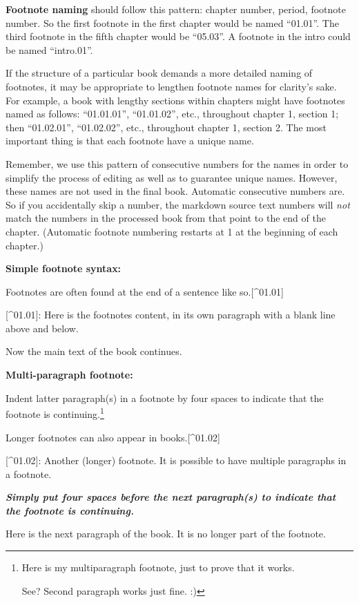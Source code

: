 \documentclass[
]{book}
\newenvironment{Shaded}{\begin{snugshade}}{\end{snugshade}}
\newcommand{\InformationTok}[1]{\textcolor[rgb]{0.56,0.35,0.01}{\textbf{\textit{#1}}}}
\newcommand{\NormalTok}[1]{#1}
\newcommand{\OtherTok}[1]{\textcolor[rgb]{0.56,0.35,0.01}{#1}}
\begin{document}
\textbf{Footnote naming} should follow this pattern: chapter number, period, footnote number. So the first footnote in the first chapter would be named ``01.01''. The third footnote in the fifth chapter would be ``05.03''. A footnote in the intro could be named ``intro.01''.

If the structure of a particular book demands a more detailed naming of footnotes, it may be appropriate to lengthen footnote names for clarity's sake. For example, a book with lengthy sections within chapters might have footnotes named as follows: ``01.01.01'', ``01.01.02'', etc., throughout chapter 1, section 1; then ``01.02.01'', ``01.02.02'', etc., throughout chapter 1, section 2. The most important thing is that each footnote have a unique name.

Remember, we use this pattern of consecutive numbers for the names in order to simplify the process of editing as well as to guarantee unique names. However, these names are not used in the final book. Automatic consecutive numbers are. So if you accidentally skip a number, the markdown source text numbers will \emph{not} match the numbers in the processed book from that point to the end of the chapter. (Automatic footnote numbering restarts at 1 at the beginning of each chapter.)

\textbf{Simple footnote syntax:}

\begin{Shaded}
\begin{Highlighting}[]
\NormalTok{Footnotes are often found at the end of a sentence like so.}\OtherTok{[\^{}01.01]}

\OtherTok{[\^{}01.01]: }\NormalTok{Here is the footnote\textquotesingle{}s content, in its own paragraph with a blank line above and below.}

\NormalTok{Now the main text of the book continues.}
\end{Highlighting}
\end{Shaded}

\textbf{Multi-paragraph footnote:}

Indent latter paragraph(s) in a footnote by four spaces to indicate that the footnote is continuing.\footnote{Here is my multiparagraph footnote, just to prove that it works.

  See? Second paragraph works just fine. :)}

\begin{Shaded}
\begin{Highlighting}[]
\NormalTok{Longer footnotes can also appear in books.}\OtherTok{[\^{}01.02]}

\OtherTok{[\^{}01.02]: }\NormalTok{Another (longer) footnote. It is possible to have multiple paragraphs in a footnote.}

\InformationTok{    Simply put four spaces before the next paragraph(s) to indicate that the footnote is continuing.}
  
\NormalTok{Here is the next paragraph of the book. It is no longer part of the footnote.}
\end{Highlighting}
\end{Shaded}
\end{document}

